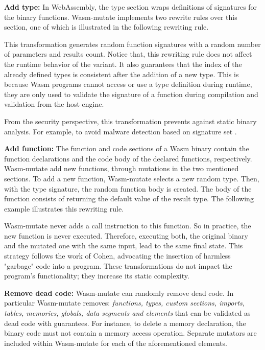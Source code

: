 \documentclass[sigplan,screen]{acmart}
\newcommand{\tool}{Wasm-mutate\xspace}
\begin{document}
\textbf{Add type:}
In WebAssembly, the type section wraps definitions of signatures for the binary functions.
\tool implements two rewrite rules over this section, one of which is illustrated in the following rewriting rule. 



This transformation generates random function signatures with a random number of parameters and results count.
Notice that, this rewriting rule does not affect the runtime behavior of the  variant.
It also guarantees that the index of the already defined types is consistent after the addition of a new type. This is because Wasm programs cannot access or use a type definition during runtime, they are only used to validate the signature of a function during compilation and validation from the host engine.

From the security perspective, this transformation prevents against static binary analysis. 
For example, to avoid malware detection based on signature set \cite{CABRERAARTEAGA2023103296}.

\textbf{Add function:} The function and code sections of a Wasm binary contain the function  declarations and the code body of the declared functions, respectively.
\tool add new functions, through mutations in the two mentioned sections.
To add a new function, \tool selects a new random type.
Then, with the type signature, the random function body is created.
The body of the function consists of returning the default value of the result type.
The following example illustrates this rewriting rule.



\tool never adds a call instruction to this function.
So in practice, the new function is never executed.
Therefore, executing both, the original binary and the mutated one with the same input, lead to the same final state.
This strategy follows the work of Cohen, advocating the insertion of harmless "garbage" code into a program. 
These transformations do not impact the program's functionality; they increase its static complexity.

\textbf{Remove dead code:} \tool can randomly remove dead code.
In particular \tool removes: \emph{functions, types, custom sections, imports, tables, memories, globals, data segments and elements} that can be validated as dead code with guarantees.
For instance, to delete a memory declaration, the binary code must not contain a memory access operation. 
Separate mutators are included within \tool for each of the aforementioned elements.
\end{document}

